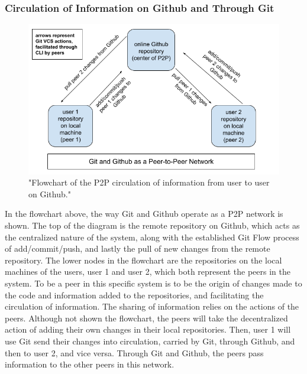 \subsubsection{Circulation of Information on Github and Through Git}

\begin{figure}[hbt!]
\begin{center}
\includegraphics[width=.8\textwidth]{./images/github_p2p_flowchart.png}
\caption{"Flowchart of the P2P circulation of information from user to user on Github."}
\vspace{0in}
\end{center}
\end{figure}
In the flowchart above, the way Git and Github operate as a P2P network is shown. The top of the diagram is the remote repository on Github, which acts as the centralized nature of the system, along with the established Git Flow process of add/commit/push, and lastly the pull of new changes from the remote repository. The lower nodes in the flowchart are the repositories on the local machines of the users, user 1 and user 2, which both represent the peers in the system. To be a peer in this specific system is to be the origin of changes made to the code and information added to the repositories, and facilitating the circulation of information. The sharing of information relies on the actions of the peers. Although not shown the flowchart, the peers will take the decentralized action of adding their own changes in their local repositories. Then, user 1 will use Git send their changes into circulation, carried by Git, through Github, and then to user 2, and vice versa. Through Git and Github, the peers pass information to the other peers in this network. 

